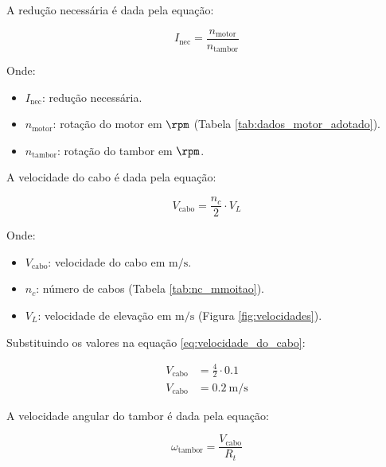 ﻿A redução necessária é dada pela equação:

\begin{equation}
  I_{\text{nec}} = \frac{n_{\text{motor}}}{n_{\text{tambor}}}
  \label{eq:reducao_necessaria}
\end{equation}

Onde:

\begin{itemize}[leftmargin=1.25cm]
  \item $I_{\text{nec}}$: redução necessária.
  \item $n_{\text{motor}}$: rotação do motor em $\si{\rpm}$ (Tabela \ref{tab:dados_motor_adotado}).
  \item $n_{\text{tambor}}$: rotação do tambor em $\si{\rpm}$.
\end{itemize}

\vspace{1em}

A velocidade do cabo é dada pela equação:

\begin{equation}
  V_{\text{cabo}} = \frac{n_c}{2} \cdot V_L
  \label{eq:velocidade_do_cabo}
\end{equation}

Onde:

\begin{itemize}[leftmargin=1.25cm]
  \item $V_{\text{cabo}}$: velocidade do cabo em $\si{\meter\per\second}$.
  \item $n_c$: número de cabos (Tabela \ref{tab:nc_mmoitao}).
  \item $V_L$: velocidade de elevação em $\si{\meter\per\second}$ (Figura \ref{fig:velocidades}).
\end{itemize}

\vspace{1em}

Substituindo os valores na equação \eqref{eq:velocidade_do_cabo}:

\begin{align*}
  V_{\text{cabo}} & = \frac{4}{2} \cdot \num{0.1}         \\
  V_{\text{cabo}} & = \boxed{\SI{0.2}{\meter\per\second}}
\end{align*}

A velocidade angular do tambor é dada pela equação:

\begin{equation}
  \omega_{\text{tambor}} = \frac{V_{\text{cabo}}}{R_t}
  \label{eq:velocidade_angular_do_tambor}
\end{equation}

